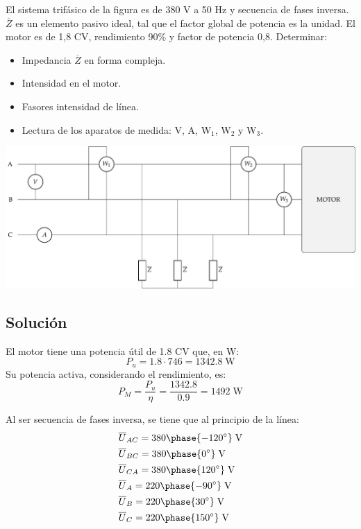 El sistema trifásico de la figura es de 380 V a 50 Hz y secuencia de fases inversa. $\overline{Z}$ es un elemento pasivo ideal, tal que el factor global de potencia es la unidad. El motor es de 1,8 CV, rendimiento 90\% y factor de potencia 0,8. Determinar:
\begin{itemize}
    \item  Impedancia $\overline{Z}$ en forma compleja.
    \item  Intensidad en el motor.
    \item  Fasores intensidad de línea.
    \item  Lectura de los aparatos de medida: V, A, W$_1$, W$_2$ y W$_3$.
\end{itemize}
\begin{center}
  \includegraphics[width=\linewidth]{figuras/ej7_BT3.pdf}
\end{center}

\subsection*{Solución}
El motor tiene una potencia útil de 1.8 CV que, en W:
\begin{equation*}
  P_u=1.8\cdot 746=1342.8\;\text{W}    
\end{equation*}
Su potencia activa, considerando el rendimiento, es:
\begin{equation*}
  P_M=\dfrac{P_u}{\eta}=\dfrac{1342.8}{0.9}=1492\;\text{W}
\end{equation*} 


Al ser secuencia de fases inversa, se tiene que al principio de la
línea:
\begin{align*}
  &\overline{U}_{AC}=380\phase{-120^\circ}\;\text{V} \\
  &\overline{U}_{BC}=380\phase{0^\circ}\;\text{V} \\
  &\overline{U}_{CA}=380\phase{120^\circ}\;\text{V}  \\
  &\overline{U}_A=220\phase{-90^\circ}\;\text{V}\\
  &\overline{U}_B=220\phase{30^\circ}\;\text{V}\\
  &\overline{U}_C=220\phase{150^\circ}\;\text{V}
\end{align*}

